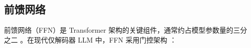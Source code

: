 

    
    



\subsection{前馈网络}

前馈网络（FFN）是 Transformer 架构的关键组件，通常约占模型参数量的三分之二 \cite{geva2021ffnmemory}。在现代仅解码器 LLM 中，FFN 采用门控架构 \cite{shazeer2020glu}：

